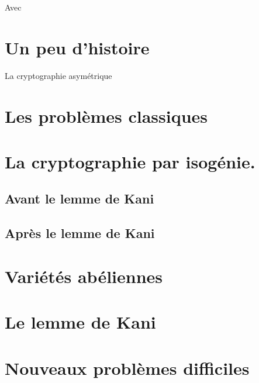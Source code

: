 \documentclass[12pt]{article}
\theoremstyle{plain}
\theoremstyle{definition}
\theoremstyle{remark}
\begin{document}
Avec 

\section{Un peu d'histoire}
La cryptographie asymétrique 

\section{Les problèmes classiques}

\section{La cryptographie par isogénie.}


\subsection{Avant le lemme de Kani}

\subsection{Après le lemme de Kani}

\section{Variétés abéliennes}

\section{Le lemme de Kani}

\section{Nouveaux problèmes difficiles}
\end{document}
